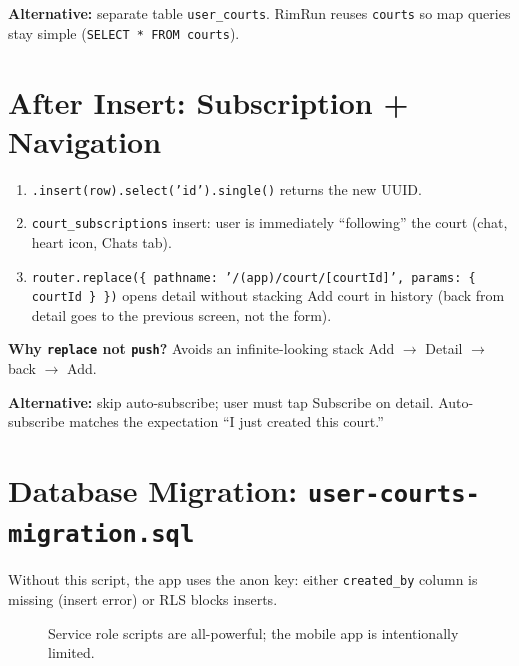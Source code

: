 \documentclass[11pt,a4paper]{article}
\begin{document}
\textbf{Alternative:} separate table \texttt{user\_courts}. RimRun reuses \texttt{courts} so map queries stay simple (\texttt{SELECT * FROM courts}).

\section{After Insert: Subscription + Navigation}

\begin{enumerate}[noitemsep]
    \item \texttt{.insert(row).select('id').single()} returns the new UUID.
    \item \texttt{court\_subscriptions} insert: user is immediately ``following'' the court (chat, heart icon, Chats tab).
    \item \texttt{router.replace(\{ pathname: '/(app)/court/[courtId]', params: \{ courtId \} \})} opens detail without stacking Add court in history (back from detail goes to the previous screen, not the form).
\end{enumerate}

\textbf{Why \texttt{replace} not \texttt{push}?} Avoids an infinite-looking stack Add $\to$ Detail $\to$ back $\to$ Add.

\textbf{Alternative:} skip auto-subscribe; user must tap Subscribe on detail. Auto-subscribe matches the expectation ``I just created this court.''

\section{Database Migration: \texttt{user-courts-migration.sql}}

Without this script, the app uses the anon key: either \texttt{created\_by} column is missing (insert error) or RLS blocks inserts.

\begin{figure}[h]
\centering
{}
\caption{Service role scripts are all-powerful; the mobile app is intentionally limited.}
\end{figure}
\end{document}
